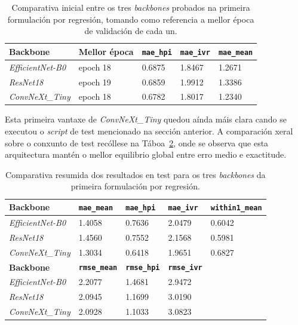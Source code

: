 {
\begin{table}[htbp]
    \centering
    \footnotesize
    \setlength{\tabcolsep}{4pt}
    \begin{tabular}{p{}|p{}|p{}|p{}|p{}}
        \rowcolor{udcpink!25}
        \textbf{Backbone} & \textbf{Mellor época} & \textbf{\texttt{mae\_hpi}} & \textbf{\texttt{mae\_ivr}} & \textbf{\texttt{mae\_mean}} \\\hline
        \textit{EfficientNet-B0} & epoch 18 & 0.6875 & 1.8467 & 1.2671 \\
        \textit{ResNet18} & epoch 19 & 0.6859 & 1.9912 & 1.3386 \\
        \textit{ConvNeXt\_Tiny} & epoch 18 & 0.6782 & 1.8017 & 1.2340  \\
    \end{tabular}
    \caption{Comparativa inicial entre os tres \textit{backbones} probados na primeira formulación por regresión, tomando como referencia a mellor época de validación de cada un.}
    \label{tab:comparativa-backbones-regresion}
\end{table}
}

Esta primeira vantaxe de \textit{ConvNeXt\_Tiny} quedou aínda máis clara cando se executou o
\textit{script} de test mencionado na sección anterior. A comparación xeral sobre o conxunto de
test recóllese na Táboa~\ref{tab:comparativa-backbones-test}, onde se observa que esta arquitectura
mantén o mellor equilibrio global entre erro medio e exactitude.

{
\begin{table}[htbp]
    \centering
    \footnotesize
    \setlength{\tabcolsep}{4pt}
    \begin{tabular}{p{}|p{}|p{}|p{}|p{}}
        \rowcolor{udcpink!25}
        \textbf{Backbone} & \textbf{\texttt{mae\_mean}} & \textbf{\texttt{mae\_hpi}} & \textbf{\texttt{mae\_ivr}} & \textbf{\texttt{within1\_mean}} \\\hline
        \textit{EfficientNet-B0} & 1.4058& 0.7636 & 2.0479 & 0.6042 \\
        \textit{ResNet18} & 1.4560 & 0.7552 & 2.1568 & 0.5981 \\
        \textit{ConvNeXt\_Tiny} & 1.3034 & 0.6418 & 1.9651 & 0.6827 \\
        \rowcolor{udcpink!25}
        \textbf{Backbone} & \textbf{\texttt{rmse\_mean}} & \textbf{\texttt{rmse\_hpi}} & \textbf{\texttt{rmse\_ivr}} \\\hline
        \textit{EfficientNet-B0} & 2.2077 & 1.4681 & 2.9472 \\
        \textit{ResNet18} & 2.0945 & 1.1699 & 3.0190 \\
        \textit{ConvNeXt\_Tiny} & 2.0928 & 1.1033 & 3.0823 \\
    \end{tabular}
    \caption{Comparativa resumida dos resultados en test para os tres \textit{backbones} da primeira formulación por regresión.}
    \label{tab:comparativa-backbones-test}
\end{table}
}

